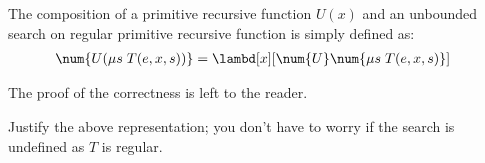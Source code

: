 \documentclass[../../../include/open-logic-section]{subfiles}
\begin{document}
The composition of a primitive recursive function $U(x)$ and an
unbounded search on regular primitive recursive function is simply
defined as:
\begin{align*}
  \num{U(\mu s \; T(e,x,s))} &= \lambd[x][\num{U} \num{\mu s \; T(e,x,s)}]
\end{align*}

The proof of the correctness is left to the reader.

\begin{prob}
  Justify the above representation; you don't have to worry if the
  search is undefined as $T$ is regular.
\end{prob}
\end{document}
